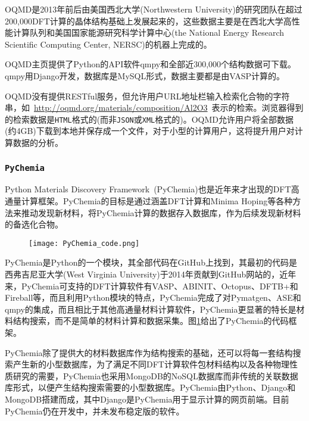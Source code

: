 \textrm{OQMD}是2013年前后由美国西北大学\textrm{(Northwestern University)}的研究团队在超过200,000\textrm{DFT}计算的晶体结构基础上发展起来的，这些数据主要是在西北大学高性能计算队列和美国国家能源研究科学计算中心\textrm{(the National Energy Research Scientific Computing Center, NERSC)}的机器上完成的。

\textrm{OQMD}主页提供了\textrm{Python}的\textrm{API}软件\textrm{qmpy}\cite{qmpy_URL}和全部近300,000个结构数据可下载。\textrm{qmpy}用\textrm{Django}开发，数据库是\textrm{MySQL}形式，数据主要都是由\textrm{VASP}计算的。

\textrm{OQMD}没有提供\textrm{RESTful}服务，但允许用户\textrm{URL}地址栏输入检索化合物的字符串，如~\textrm{\url{http://oqmd.org/materials/composition/Al2O3}}~表示的检索。浏览器得到的检索数据是\texttt{HTML}格式的(而非\texttt{JSON}或\texttt{XML}格式的)。\textrm{OQMD}允许用户将全部数据(约4\textrm{GB})下载到本地并保存成一个文件，对于小型的计算用户，这将提升用户对计算数据的分析。

\subsubsection{\tt{PyChemia}}
\textrm{Python Materials Discovery Framework~(PyChemia)}也是近年来才出现的\textrm{DFT}高通量计算框架。\textrm{PyChemia}的目标是通过涵盖\textrm{DFT}计算和\textrm{Minima Hoping}等各种方法来推动发现新材料，将\textrm{PyChemia}计算的数据存入数据库，作为后续发现新材料的备选化合物。

\begin{figure}[h!]
\centering
\vspace*{-0.1in}
\texttt{[image: PyChemia\_code.png]}
\caption{\fontsize{7.2pt}{4.2pt}}%
\label{PyChemia_FireWork}
\end{figure} 
\textrm{PyChemia}是\textrm{Python}的一个模块，其全部代码在\textrm{GitHub}上找到\cite{PyChemia_Github}，其最初的代码是西弗吉尼亚大学\textrm{(West Virginia University)}于2014年贡献到\textrm{GitHub}网站的，近年来，\textrm{PyChemia}可支持的\textrm{DFT}计算软件有\textrm{VASP}、\textrm{ABINIT}、\textrm{Octopus}、\textrm{DFTB+}和\textrm{Fireball}等，而且利用Python模块的特点，\textrm{PyChemia}完成了对\textrm{Pymatgen}、\textrm{ASE}和\textrm{qmpy}的集成，而且相比于其他高通量材料计算软件，\textrm{PyChemia}更显著的特长是材料结构搜索，而不是简单的材料计算和数据采集。图\ref{PyChemia_FireWork}给出了\textrm{PyChemia}的代码框架。

\textrm{PyChemia}除了提供大的材料数据库作为结构搜索的基础，还可以将每一套结构搜索产生新的小型数据库，为了满足不同\textrm{DFT}计算软件包材料结构以及各种物理性质研究的需要，\textrm{PyChemia}也采用\textrm{MongoDB}的\textrm{NoSQL}数据库而非传统的关联数据库形式，以便产生结构搜索需要的小型数据库。\textrm{PyChemia}由\textrm{Python}、\textrm{Django}和\textrm{MongoDB}搭建而成，其中\textrm{Django}是\textrm{PyChemia}用于显示计算的网页前端。目前\textrm{PyChemia}仍在开发中，并未发布稳定版的软件。

